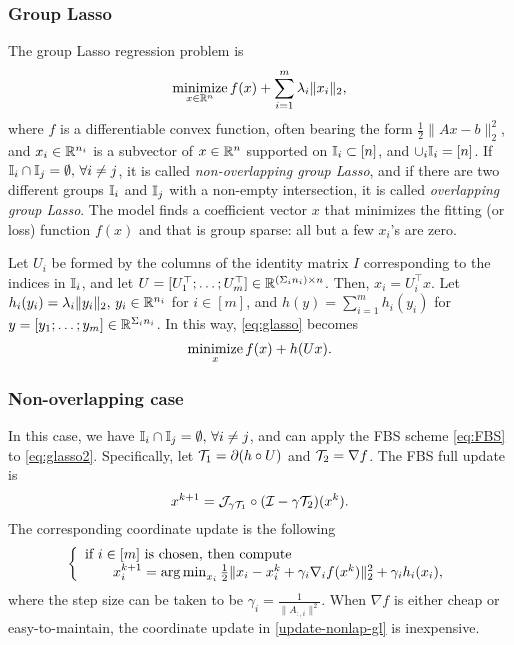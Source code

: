 \subsubsection{Group Lasso}\label{sec:glasso}
The group Lasso regression problem \cite{YL2006GrpLasso} is 
\begin{equation}\label{eq:glasso}
\Min_{x\in\RR^n}  f(x)+\sum_{i=1}^m\lambda_i\|x_i\|_2,
\end{equation} 
where $ f$ is a differentiable convex function, often bearing the form $\frac{1}{2}\|Ax-b\|_2^2$, and $x_i\in \mathbb{R}^{n_i}$ is a subvector of $x\in\mathbb{R}^n$ supported on $\mathbb{I}_i\subset [n]$, and $\cup_i \mathbb{I}_i= [n]$. If $\mathbb{I}_i\cap \mathbb{I}_j =\emptyset, \,\forall i\neq j$, it is called \emph{non-overlapping group Lasso}, and if there are two different groups $\mathbb{I}_i$ and $\mathbb{I}_j$ with a non-empty intersection, it is called \emph{overlapping group Lasso}. The model finds a coefficient vector $x$ that minimizes the fitting (or loss) function $f(x)$ and that is group sparse: all but a few $x_i$'s are zero.  

Let $U_i$ be formed by the columns of the identity matrix $I$ corresponding to the indices in $\mathbb{I}_i$, and let $U=[U_1^\top;\ldots;U_m^\top]\in\mathbb{R}^{(\Sigma_i n_i)\times n}$. Then, $x_i=U_i^\top x$. Let $h_i(y_i)=\lambda_i\|y_i\|_2,\,y_i\in\mathbb{R}^{n_i}$ for $i \in [m]$, and $h(y)=\sum_{i=1}^m h_i(y_i)$ for $y=[y_1;\ldots;y_m]\in\mathbb{R}^{\Sigma_i n_i}$. In this way, \eqref{eq:glasso} becomes
\begin{equation}\label{eq:glasso2}
\Min_x f(x)+h(Ux).
\end{equation}

\subsubsection*{Non-overlapping case~\cite{YL2006GrpLasso}} In this case, we have $\mathbb{I}_i\cap \mathbb{I}_j =\emptyset, \,\forall i\neq j$, and can apply the FBS scheme \eqref{eq:FBS} to \eqref{eq:glasso2}. Specifically, let ${\mathcal{T}}_1=\partial (h\circ U)$ and ${\mathcal{T}}_2=\nabla f$. The FBS full update is 
$$x^{k+1}={\mathcal{J}}_{\gamma {\mathcal{T}}_1}\circ({\mathcal{I}}-\gamma{\mathcal{T}}_2)(x^k).$$
The corresponding coordinate update is the following
\begin{equation}\label{update-nonlap-gl}
{\left\{
\begin{array}{l}
\text{if }i \in [m]\text{ is chosen, then compute}\\
\qquad x_i^{k+1}=\argmin_{x_i}\frac{1}{2}\|x_i-x_i^k+\gamma_i \nabla_i f(x^k)\|_2^2+ \gamma_i h_i(x_i),\\
\end{array}
\right.
}\end{equation}
where the step size can be taken to be $\gamma_i=\frac{1}{\|A_{:,i}\|^2}$. When $\nabla f$ is either cheap or easy-to-maintain,  the coordinate update in \eqref{update-nonlap-gl} is inexpensive.

